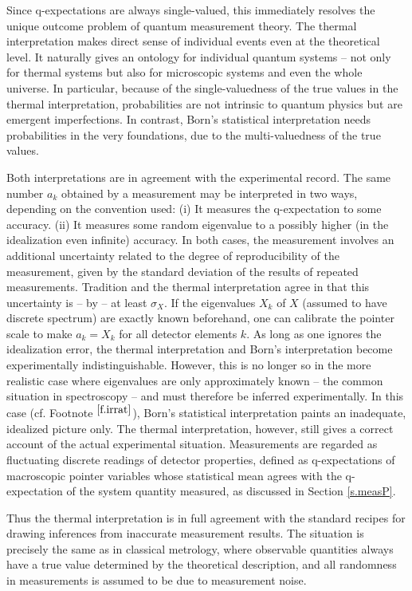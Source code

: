\documentclass[12pt]{article}
\begin{document}
Since q-expectations are always single-valued, this immediately resolves
the unique outcome problem of quantum measurement theory. The thermal
interpretation makes direct sense of individual events even at the
theoretical level. It naturally gives an ontology for individual
quantum systems -- not only for thermal systems but also for microscopic
systems and even the whole universe.
In particular, because of the single-valuedness of the true values in 
the thermal interpretation, probabilities are not intrinsic to quantum 
physics but are emergent imperfections. In contrast,  Born's statistical
interpretation needs probabilities in the very foundations, due to the 
multi-valuedness of the true values.

Both interpretations are in agreement with the experimental record.
The same number $a_k$ obtained by a measurement may be interpreted in  
two ways, depending on the convention used: 
(i) It measures the q-expectation to some accuracy. 
(ii) It measures some random eigenvalue to a possibly higher (in the 
idealization even infinite) accuracy.
In both cases, the measurement involves an additional uncertainty
related to the degree of reproducibility of the measurement, given by
the standard deviation of the results of repeated measurements.
Tradition and the thermal interpretation agree in that this uncertainty
is -- by  -- at least $\sigma_X$.
If the eigenvalues $X_k$ of $X$ (assumed to have discrete spectrum) are 
exactly known beforehand, one can calibrate the pointer scale to make
$a_k=X_k$ for all detector elements $k$. As long as one ignores 
the idealization error, the thermal interpretation and Born's 
interpretation become experimentally indistinguishable. However, this 
is no longer so in the more realistic case where eigenvalues are only 
approximately known -- the common situation in spectroscopy -- and must 
therefore be inferred experimentally. In this case (cf. Footnote 
${}^{\ref{f.irrat}}$), Born's statistical 
interpretation paints an inadequate, idealized picture only. The thermal
interpretation, however, still gives a correct account of the actual 
experimental situation. 
Measurements are regarded as fluctuating discrete readings of detector 
properties, defined as q-expectations of macroscopic pointer variables 
whose statistical mean agrees with the q-expectation of the system 
quantity measured, as discussed in Section \ref{s.measP}.

Thus the thermal interpretation is in full agreement with the standard 
recipes for drawing inferences from inaccurate measurement results.
The situation is precisely the same as in classical metrology, where 
observable quantities always have a true value determined by the 
theoretical description, and all randomness in measurements is assumed
to be due to measurement noise.
\end{document}
